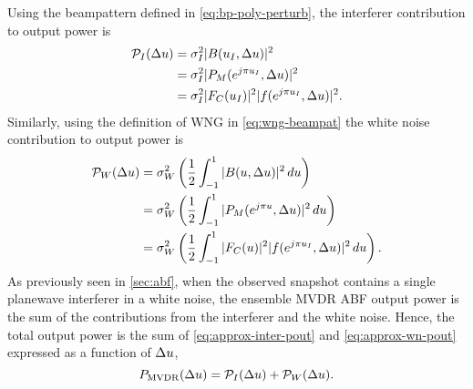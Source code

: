 Using the beampattern defined in \eqref{eq:bp-poly-perturb}, the interferer contribution to output power is
\begin{align} 
  \label{eq:approx-inter-pout}
  \mathcal{P}_I(\Delta u) &= \sigma_I^2|B(u_I, \Delta u)|^2 \nonumber \\
&= \sigma_I^2|{P}_M(e^{j\pi u_I}, \Delta u)|^2 \nonumber \\
&= \sigma_I^2|F_C(u_I)|^2 |f(e^{j\pi u_I}, \Delta u) |^2.
\end{align}
Similarly, using the definition of WNG in \eqref{eq:wng-beampat} the white noise contribution to output power is
\begin{align} 
\label{eq:approx-wn-pout}
  \mathcal{P}_W(\Delta u) &= \sigma^2_W\left(\frac{1}{2}\int_{-1}^{1}|B(u, \Delta u)|^2\, du\right) \nonumber \\
&= \sigma^2_W\left(\frac{1}{2}\int_{-1}^{1}|{P}_M(e^{j\pi u}, \Delta u)|^2\, du\right) \nonumber \\
&= \sigma^2_W\left(\frac{1}{2}\int_{-1}^{1} |F_C(u)|^2 |f(e^{j\pi u_I}, \Delta u) |^2\, du\right).
\end{align}
As previously seen in \sect{}\ref{sec:abf}, when the observed
snapshot contains a single planewave interferer in a white noise, the
ensemble MVDR ABF output power is the sum of the contributions from
the interferer and the white noise. Hence, the total output power is
the sum of \eqref{eq:approx-inter-pout} and \eqref{eq:approx-wn-pout}
expressed as a function of $\Delta u$,
\begin{equation}
  \label{eq:pout-deltau}
  P_{\rm MVDR}(\Delta u) = \mathcal{P}_I(\Delta u) + \mathcal{P}_W(\Delta u).  
\end{equation}

